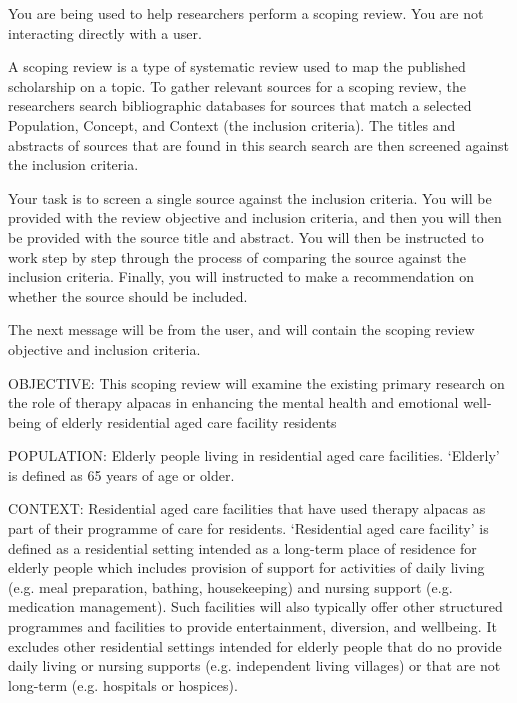 \documentclass{article}
\begin{document}
\pagestyle{empty}
\begin{description}

  \System You are being used to help researchers perform a scoping review. You
  are not interacting directly with a user.

  A scoping review is a type of systematic review used to map the published
  scholarship on a topic. To gather relevant sources for a scoping review, the
  researchers search bibliographic databases for sources that match a selected
  Population, Concept, and Context (the inclusion criteria). The titles and
  abstracts of sources that are found in this search search are then screened
  against the inclusion criteria.

  Your task is to screen a single source against the inclusion criteria. You
  will be provided with the review objective and inclusion criteria, and then
  you will then be provided with the source title and abstract. You will then
  be instructed to work step by step through the process of comparing the
  source against the inclusion criteria. Finally, you will instructed to make a
  recommendation on whether the source should be included.

  The next message will be from the user, and will contain the scoping review
  objective and inclusion criteria.

  \User OBJECTIVE: This scoping review will examine the existing primary
  research on the role of therapy alpacas in enhancing the mental health and
  emotional well-being of elderly residential aged care facility residents
  
  POPULATION: Elderly people living in residential aged care facilities.
  `Elderly' is defined as 65 years of age or older. 

  CONTEXT: Residential aged care facilities that have used therapy alpacas as
  part of their programme of care for residents. `Residential aged care
  facility' is defined as a residential setting intended as a long-term place
  of residence for elderly people which includes provision of support for
  activities of daily living (e.g. meal preparation, bathing, housekeeping) and
  nursing support (e.g. medication management). Such facilities will also
  typically offer other structured programmes and facilities to provide
  entertainment, diversion, and wellbeing. It excludes other residential
  settings intended for elderly people that do no provide daily living or
  nursing supports (e.g. independent living villages) or that are not long-term
  (e.g. hospitals or hospices). 


\end{description}
\end{document}

